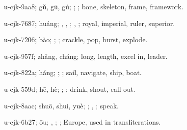 \begin{multicols}{2}
{\cjkgGlue{}u-cjk-9aa8; gǔ, gū, gú; \cjkgGlue{}; \cjkgGlue{}; bone, skeleton, frame, framework.

\cjkgGlue{}u-cjk-7687; huáng; \cjkgGlue{}, \cjkgGlue{}, \cjkgGlue{}; \cjkgGlue{}, \cjkgGlue{}; royal, imperial, ruler, superior.

\cjkgGlue{}u-cjk-7206; bào; \cjkgGlue{}\cjkgGlue{}\cjkgGlue{}; \cjkgGlue{}; crackle, pop, burst, explode.

\cjkgGlue{}u-cjk-957f; zhǎng, cháng; long, length, excel in, leader.

\cjkgGlue{}u-cjk-822a; háng; \cjkgGlue{}; \cjkgGlue{}; sail, navigate, ship, boat.

\cjkgGlue{}u-cjk-559d; hē, hè; \cjkgGlue{}; \cjkgGlue{}; drink, shout, call out.

\cjkgGlue{}u-cjk-8aac; shuō, shuì, yuè; \cjkgGlue{}\cjkgGlue{}\cjkgGlue{}; \cjkgGlue{}, \cjkgGlue{}; speak.

\cjkgGlue{}u-cjk-6b27; ōu; \cjkgGlue{}\cjkgGlue{}\cjkgGlue{}, \cjkgGlue{}\cjkgGlue{}\cjkgGlue{}; \cjkgGlue{}; Europe, used in transliterations.

}
\end{multicols}

